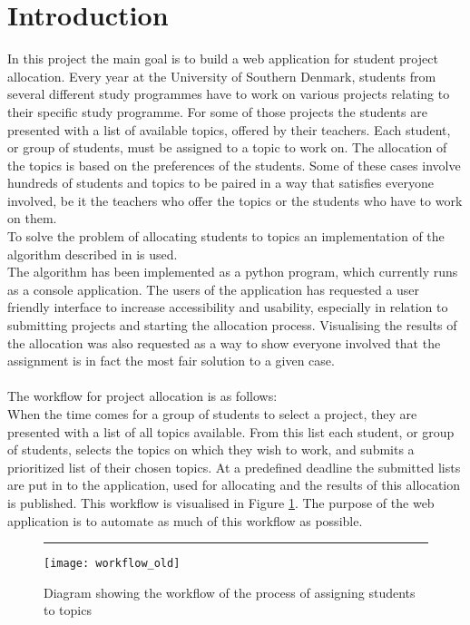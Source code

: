 \section{Introduction}\label{intro}

In this project the main goal is to build a web application for student project allocation. Every year at the University of Southern Denmark, students from several different study programmes have to work on various projects relating to their specific study programme. For some of those projects the students are presented with a list of available topics, offered by their teachers. Each student, or group of students, must be assigned to a topic to work on. The allocation of the topics is based on the preferences of the students. Some of these cases involve hundreds of students and topics to be paired in a way that satisfies everyone involved, be it the teachers who offer the topics or the students who have to work on them.\\
To solve the problem of allocating students to topics an implementation of the algorithm described in \cite{Chiarandini2019} is used.\\The algorithm has been implemented as a python program, which currently runs as a console application. The users of the application has requested a user friendly interface to increase accessibility and usability, especially in relation to submitting projects and starting the allocation process. Visualising the results of the allocation was also requested as a way to show everyone involved that the assignment is in fact the most fair solution to a given case.
\\\\
The workflow for project allocation is as follows:\\
When the time comes for a group of students to select a project, they are presented with a list of all topics available. From this list each student, or group of students, selects the topics on which they wish to work, and submits a prioritized list of their chosen topics. At a predefined deadline the submitted lists are put in to the application, used for allocating and the results of this allocation is published. This workflow is visualised in Figure \ref{fig:intro_old}. The purpose of the web application is to automate as much of this workflow as possible.
\begin{figure}[b]
\hrule
\vspace*{0.2cm}
\texttt{[image: workflow\_old]}
\caption{Diagram showing the workflow of the process of assigning students to topics}
\label{fig:intro_old}
\end{figure}
